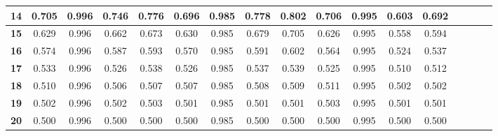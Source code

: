 \begin{table*}[!t]
\begin{tabular}{|c|c|c|c|c|c|c|c|c|c|c|c|c|c|c|c|c|}
\hline
\bfseries 14 & 0.705 & 0.996 & 0.746 & 0.776 & 0.696 & 0.985 & 0.778 & 0.802 & 0.706 & 0.995 & 0.603 & 0.692 \\
\hline
\bfseries 15 & 0.629 & 0.996 & 0.662 & 0.673 & 0.630 & 0.985 & 0.679 & 0.705 & 0.626 & 0.995 & 0.558 & 0.594 \\
\hline
\bfseries 16 & 0.574 & 0.996 & 0.587 & 0.593 & 0.570 & 0.985 & 0.591 & 0.602 & 0.564 & 0.995 & 0.524 & 0.537 \\
\hline
\bfseries 17 & 0.533 & 0.996 & 0.526 & 0.538 & 0.526 & 0.985 & 0.537 & 0.539 & 0.525 & 0.995 & 0.510 & 0.512 \\
\hline
\bfseries 18 & 0.510 & 0.996 & 0.506 & 0.507 & 0.507 & 0.985 & 0.508 & 0.509 & 0.511 & 0.995 & 0.502 & 0.502 \\
\hline
\bfseries 19 & 0.502 & 0.996 & 0.502 & 0.503 & 0.501 & 0.985 & 0.501 & 0.501 & 0.503 & 0.995 & 0.501 & 0.501 \\
\hline
\bfseries 20 & 0.500 & 0.996 & 0.500 & 0.500 & 0.500 & 0.985 & 0.500 & 0.500 & 0.500 & 0.995 & 0.500 & 0.500 \\
\hline
\end{tabular}
\end{table*}

